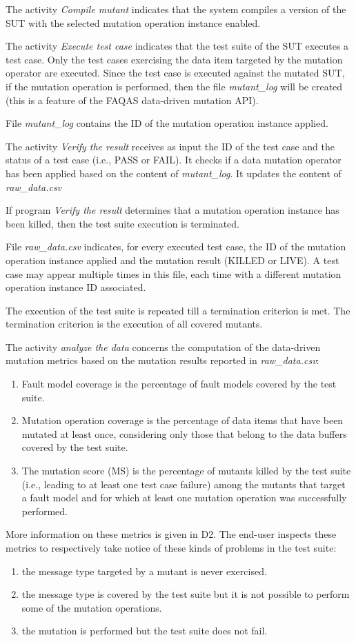 The activity \emph{Compile mutant} indicates that the system compiles a version of the SUT with the selected mutation operation instance enabled.

The activity \emph{Execute test case} indicates that the test suite of the SUT executes a test case. Only the test cases exercising the data item targeted by the mutation operator are executed. Since the test case is executed against the mutated SUT, if the mutation operation is performed, then the file \emph{mutant\_log} will be created (this is a feature of the FAQAS data-driven mutation API).

File \emph{mutant\_log} contains the ID of the mutation operation instance applied.

The activity \emph{Verify the result} receives as input the ID of the test case and the status of a test case (i.e., PASS or FAIL). It checks if a data mutation operator has been applied based on the content of \emph{mutant\_log}. It updates the content of \emph{raw\_data.csv}

If program \emph{Verify the result} determines that a mutation operation instance has been killed, then the test suite execution is terminated.

File \emph{raw\_data.csv} indicates, for every executed test case, the ID of the mutation operation instance applied and the mutation result (KILLED or LIVE). A test case may appear multiple times in this file, each time with a different mutation operation instance ID associated.

The execution of the test suite is repeated till a termination criterion is met. The termination criterion is the execution of all covered mutants.

The activity \emph{analyze the data} concerns the computation of the data-driven mutation metrics based on the mutation results reported in \emph{raw\_data.csv}:
\begin{enumerate}
	\item Fault model coverage is the percentage of fault models covered by the test suite.
	\item Mutation operation coverage is the percentage of data items that have been mutated at least once, considering only those that belong to the data buffers covered by the test suite.
	\item The mutation score (MS) is the percentage of mutants killed by the test suite (i.e., leading to at least one test case failure) among the mutants that target a fault model and for which at least one mutation operation was successfully performed.
\end{enumerate}
More information on these metrics is given in D2.
The end-user inspects these metrics to respectively take notice of these kinds of problems in the test suite:
\begin{enumerate}
	\item the message type targeted by a mutant is never exercised.
	\item the message type is covered by the test suite but it is not possible to perform some of the mutation operations.
	\item the mutation is performed but the test suite does not fail.
\end{enumerate}

